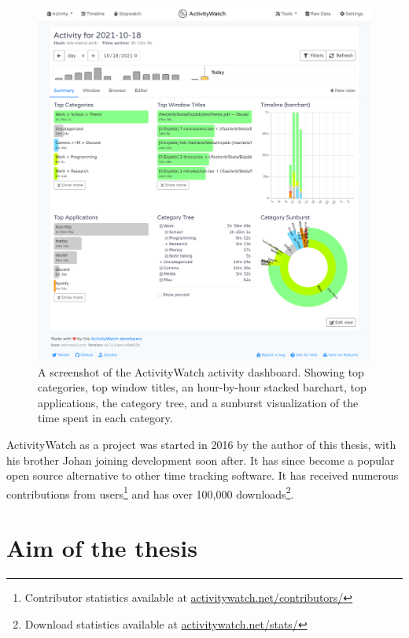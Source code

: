         \begin{figure}[h]
        \centering
        \includegraphics[width=14cm,frame]{img/screenshot-aw-activity.png}
        \caption{A screenshot of the ActivityWatch activity dashboard. Showing top categories, top window titles, an hour-by-hour stacked barchart, top applications, the category tree, and a sunburst visualization of the time spent in each category.}\label{fig:aw}
        \end{figure}

        ActivityWatch as a project was started in 2016 by the author of this thesis, with his brother Johan joining development soon after. It has since become a popular open source alternative to other time tracking software. It has received numerous contributions from users\footnote{Contributor statistics available at \href{https://activitywatch.net/contributors/}{activitywatch.net/contributors/}} and has over 100,000 downloads\footnote{Download statistics available at \href{https://activitywatch.net/stats/}{activitywatch.net/stats/}}.


\section{Aim of the thesis}\label{section:aim}

